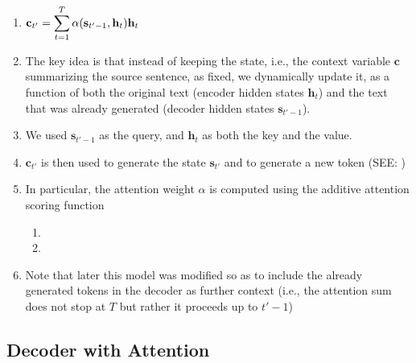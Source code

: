 \begin{enumerate}[itemsep=0.15cm]
    \item $\mathbf{c}_{t'} = \displaystyle\sum_{t=1}^{T} \alpha(\mathbf{s}_{t' - 1}, \mathbf{h}_{t}) \mathbf{h}_{t}$

    \item The key idea is that instead of keeping the state, i.e., the context variable $\mathbf{c}$ summarizing the source sentence, as fixed, we dynamically update it, as a function of both the original text (encoder hidden states $\mathbf{h}_{t}$) and the text that was already generated (decoder hidden states $\mathbf{s}_{t'-1}$).

    \item We used $\mathbf{s}_{t' - 1}$ as the query, and $\mathbf{h}_{t}$ as both the key and the value.

    \item $\mathbf{c}_{t'}$ is then used to generate the state $\mathbf{s}_{t'}$ and to generate a new token (SEE: )

    \item In particular, the attention weight $\alpha$ is computed using the additive attention scoring function
    \begin{enumerate}
        \item {}
        \item {}
    \end{enumerate}

    \item Note that later this model was modified so as to include the already generated tokens in the decoder as further context (i.e., the attention sum does not stop at $T$ but rather it proceeds up to $t'-1$)

    
\end{enumerate}

\subsection{Decoder with Attention \cite{dnn-1}} \label{Decoder with Attention}


